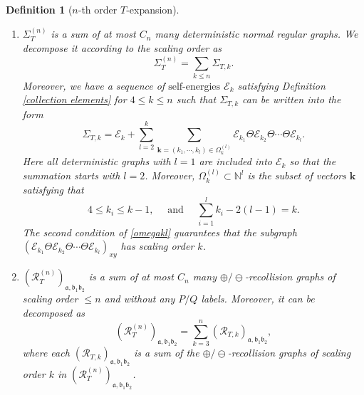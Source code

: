 \documentclass{article}
\newcommand{\1}{\mathds{1}}
\numberwithin{equation}{section}
\newcommand{\be}{\begin{equation}}
\newcommand{\ee}{\end{equation}}
\newcommand{\fa}{{\mathfrak a}}
\newcommand{\fb}{{\mathfrak b}}
\renewcommand{\leq}{\leqslant}
\renewcommand{\le}{\leq}
\newcommand{\N}{\mathbb{N}}
\newcommand{\selfs}{\text{self-energies}}
\theoremstyle{plain} %
\newtheorem{definition}[theorem]{Definition}
\theoremstyle{remark}
\newcommand{\Sdelta}{{\Sigma}_T}
\newcommand{\Sdeltak}{{\Sigma}_{T,k}}
\newcommand{\Sele}{{\mathcal E}}
\newcommand{\Selek}{{\mathcal E}}
\newcommand{\Cele}{{\mathscr E}}
\newcommand{\PTn}{\mathcal R_T^{(n)}}
\newcommand{\PTk}{{\mathcal R_{T,k}}}
\begin{document}
\begin{definition} [$n$-th order $T$-expansion]
\begin{enumerate}
		\item $\Sdelta^{(n)}$ is a sum of at most $C_n$ many deterministic normal regular graphs. %
		We decompose it according to the scaling order as 
		\be\label{decompose Sdelta0} \Sdelta^{(n)} = \sum_{k\le n} \Sdeltak.\ee
		Moreover, we have a sequence of $\selfs$ $\Sele_{k}$ satisfying Definition \ref{collection elements} for $4\le k \le n$ such that $\Sdeltak$ can be written into the form %
		\be\label{chain S2k}
		\Sdeltak=\Sele_{k} + \sum_{ l =2}^k \sum\limits_{ \mathbf k=(k_1,\cdots, k_l) \in \Omega_{k}^{(l)} } \Sele_{k_1}\Theta  \Sele_{k_2}\Theta \cdots \Theta  \Sele_{k_l} . %
		\ee
		Here all deterministic graphs with $l=1$ are included into $\Sele_k$ so that the summation starts with $l=2$. Moreover,  $\Omega_{k}^{(l)} \subset \N^l$ is the subset of vectors $\mathbf k$ satisfying that 
		\be\label{omegakl}
		4\le k_i \le k-1,\quad \text{ and }\quad  \sum_{i=1}^l  k_i  -2(l-1)=k. 
		\ee
		The second condition of \eqref{omegakl} guarantees that the subgraph $(\Sele_{k_1}\Theta  \Sele_{k_2}\Theta \cdots \Theta  \Sele_{k_l})_{xy}$ has scaling order $k$.
		
		
		\item $(\PTn)_{\fa,\fb_1\fb_2}$ is a sum of at most $C_n$ many $\oplus/\ominus$-recollision graphs of scaling order $\le n$ and without any $P/Q$ labels.  Moreover, it can be decomposed as 
		\be\label{decomposeP}(\PTn)_{\fa,\fb_1\fb_2} =\sum_{ k =3}^{ n}(\PTk)_{\fa,\fb_1\fb_2},\ee
		where each $(\PTk)_{\fa,\fb_1\fb_2}$ is a sum of the $\oplus/\ominus$-recollision graphs of scaling order $k$ in $(\PTn)_{\fa,\fb_1\fb_2}$. 
		

\end{enumerate}
\end{definition}
\end{document}
